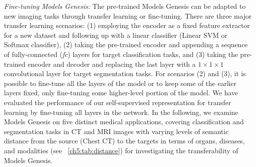 \textit{Fine-tuning Models Genesis:} The pre-trained Models Genesis can be adapted to new imaging tasks through transfer learning or fine-tuning. There are three major transfer learning scenarios: (1) employing the encoder as a fixed feature extractor for a new dataset and following up with a linear classifier (\eg Linear SVM or Softmax classifier), (2) taking the pre-trained encoder and appending a sequence of fully-connected (\textit{fc}) layers for target classification tasks, and (3) taking the pre-trained encoder and decoder and replacing the last layer with a $1\times 1\times 1$ convolutional layer for target segmentation tasks. For scenarios (2) and (3), it is possible to fine-tune all the layers of the model or to keep some of the earlier layers fixed, only fine-tuning some higher-level portion of the model. We have evaluated the performance of our self-supervised representation for transfer learning by fine-tuning all layers in the network. In the following, we examine Models Genesis on five distinct medical applications, covering classification and segmentation tasks in CT and MRI images with varying levels of semantic distance from the source (Chest CT) to the targets in terms of organs, diseases, and modalities (see \tablename~\ref{ch5:tab:distance}) for investigating the transferability of Models Genesis.



